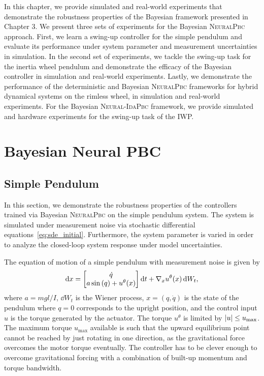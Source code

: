 In this chapter, we provide simulated and real-world experiments that
demonstrate the robustness properties of the Bayesian framework presented in
Chapter 3.
%
We present three sets of experiments for the Bayesian \textsc{NeuralPbc}
approach.
%
First, we learn a swing-up controller for the simple pendulum and evaluate its
performance under system parameter and measurement uncertainties in simulation.
%
In the second set of experiments, we tackle the swing-up task for the inertia
wheel pendulum and demonstrate the efficacy of the Bayesian controller in
simulation and real-world experiments.
%
Lastly, we demonstrate the performance of the deterministic and Bayesian
\textsc{NeuralPbc} frameworks for hybrid dynamical systems on the rimless wheel,
in simulation and real-world experiments.
%
For the Bayesian \textsc{Neural-IdaPbc} framework, we provide simulated and
hardware experiments for the swing-up task of the IWP.


\section{Bayesian Neural PBC}
\subsection{Simple Pendulum}

In this section, we demonstrate the robustness properties of the controllers
trained via Bayesian \textsc{NeuralPbc} on the simple pendulum system. The system is
simulated under measurement noise via stochastic differential
equations~\eqref{eq:sde_initial}. Furthermore, the system parameter is varied in
order to analyze the closed-loop system response under model uncertainties. 

The equation of motion of a simple pendulum with measurement noise is given by
%
\begin{equation}
    \operatorname{d}\! x = \begin{bmatrix}
        \dot{q} \\ 
        a \sin{(q)} + u^\theta(x)
    \end{bmatrix} \operatorname{d}\! t+ \nabla_x u^\theta(x) \operatorname{d}\! W_t,
    \label{eq:pendulum_sde}
\end{equation}
%
where $a=mgl/I$, $\dd W_t$ is the Wiener process, $x = (q,
\dot{q})$ is the state of the pendulum where $q = 0$ corresponds
to the upright position, and the control input $u$ is the torque generated by
the actuator. 
%
The torque \(u^\theta\) is limited by \(\left|{u}\right| \leq u_{\textrm{max}}\).
%
The maximum torque $u_{\textrm{max}}$ available is such that the upward
equilibrium point cannot be reached by just rotating in one direction, as the
gravitational force overcomes the motor torque eventually. The controller has to
be clever enough to overcome gravitational forcing with a combination of
built-up momentum and torque bandwidth.

